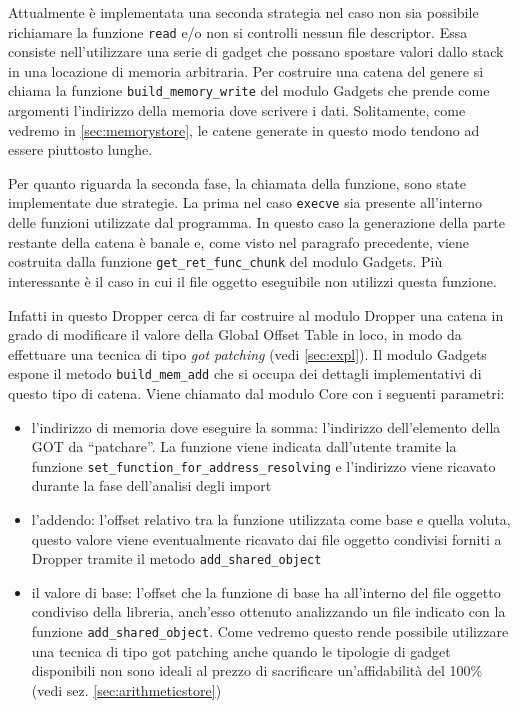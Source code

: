 Attualmente è implementata una seconda strategia nel caso non sia
possibile richiamare la funzione \lstinline{read} e/o non si controlli
nessun file descriptor. Essa consiste nell'utilizzare una serie di
gadget che possano spostare valori dallo stack in una locazione di
memoria arbitraria.  Per costruire una catena del genere si chiama la
funzione \lstinline{build_memory_write} del modulo Gadgets che prende
come argomenti l'indirizzo della memoria dove scrivere i
dati. Solitamente, come vedremo in \ref{sec:memorystore}, le catene
generate in questo modo tendono ad essere piuttosto lunghe.


Per quanto riguarda la seconda fase, la chiamata della funzione, sono
state implementate due strategie. La prima nel caso \lstinline{execve}
sia presente all'interno delle funzioni utilizzate dal programma. In
questo caso la generazione della parte restante della catena è banale
e, come visto nel paragrafo precedente, viene costruita dalla funzione
\lstinline{get_ret_func_chunk} del modulo Gadgets. Più
interessante è il caso in cui il file oggetto eseguibile non utilizzi
questa funzione. 

Infatti in questo Dropper cerca di far costruire al modulo Dropper una
catena in grado di modificare il valore della Global Offset Table in
loco, in modo da effettuare una tecnica di tipo \emph{got patching}
(vedi \ref{sec:expl}). Il modulo Gadgets espone il metodo
\lstinline{build_mem_add} che si occupa dei dettagli
implementativi di questo tipo di catena. Viene chiamato dal modulo
Core con i seguenti parametri:

\begin{itemize}
  \item l'indirizzo di memoria dove eseguire la somma: l'indirizzo
    dell'elemento della GOT da ``patchare''. La funzione viene
    indicata dall'utente tramite la funzione
    \lstinline{set_function_for_address_resolving} e l'indirizzo viene
    ricavato durante la fase dell'analisi degli import
  \item l'addendo: l'offset relativo tra la funzione
    utilizzata come base e quella voluta, questo valore viene
    eventualmente ricavato dai file oggetto condivisi forniti a
    Dropper tramite il metodo \lstinline{add_shared_object}
  \item il valore di base: l'offset che la funzione di base ha
    all'interno del file oggetto condiviso della libreria, anch'esso
    ottenuto analizzando un file indicato con la funzione
    \lstinline{add_shared_object}. Come vedremo questo rende possibile
    utilizzare una tecnica di tipo got patching anche quando le
    tipologie di gadget disponibili non sono ideali al prezzo di
    sacrificare un'affidabilità del 100\% (vedi
    sez. \ref{sec:arithmeticstore})

\end{itemize}

